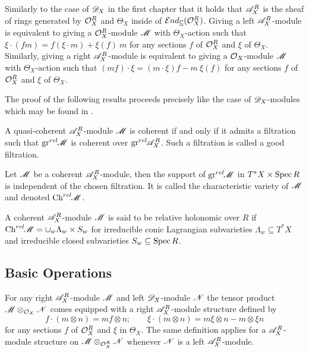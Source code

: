 Similarly to the case of $\mathscr{D}_X$ in the first chapter that  it holds that $\mathscr{A}_X^R$ is the sheaf of rings generated by $\mathcal{O}_X^R$ and $\Theta_X$ inside of $\mathcal{E}nd_{\underline{\mathbb{C}}}(\mathcal{O}_X^R)$. Giving a left $\mathscr{A}_X^R$-module is equivalent to giving a $\mathcal{O}_X^R$-module $\mathscr{M}$ with $\Theta_X$-action such that
$\xi\cdot (fm) = f (\xi \cdot m)  + \xi(f)\ m  $
for any sections $f$ of $\mathcal{O}_X^R$ and $\xi$ of $\Theta_X$. Similarly, giving a right $\mathscr{A}_X^R$-module is equivalent to giving a $\mathcal{O}_X$-module $\mathscr{M}$ with $\Theta_X$-action such that $(mf)\cdot\xi = (m\cdot\xi)f - m\ \xi(f) $ for any sections $f$ of $\mathcal{O}_X^R$ and $\xi$ of $\Theta_X$.

The proof of the following results proceeds precisely like the case of $\mathscr{D}_X$-modules which may be found in \cite[Chapter 2]{hotta2007d}. 
\begin{proposition}\label{prop: CoherentAndGoodFiltration}
    A quasi-coherent $\mathscr{A}_X^R$-module $\mathscr{M}$ is coherent if and only if it admits a filtration such that $\operatorname{gr}^{rel}\mkern-5mu \mathscr{M}$ is coherent over $\operatorname{gr}^{rel}\mkern-5mu \mathscr{A}_X^R$. Such a filtration is called a good filtration.
\end{proposition}
\begin{proposition}
    Let $\mathscr{M}$ be a coherent $\mathscr{A}_X^R$-module, then the support of $\operatorname{gr}^{rel}\mkern-5mu \mathscr{M}$ in $T^*X \times \operatorname{Spec} R$ is independent of the chosen filtration. It is called the characteristic variety of $\mathscr{M}$ and denoted $\operatorname{Ch}^{rel}\mkern-5mu \mathscr{M}$.
\end{proposition}

A coherent $\mathscr{A}_X^R$-module $\mathscr{M}$ is said to be relative holonomic over $R$ if $\operatorname{Ch}^{rel}\mkern-5mu \mathscr{M} = \cup_w \Lambda_w \times S_w$
for irreducible conic Lagrangian subvarieties $\Lambda_w\subseteq T^*X$ and irreducible closed subvarieties $S_w\subseteq \operatorname{Spec} R$.
\subsection{Basic Operations}\label{sec: BasicOperations}
For any right $\mathscr{A}_{X}^R$-module $\mathscr{M}$ and left $\mathscr{D}_X$-module $\mathscr{N}$ the tensor product $\mathscr{M} \otimes_{\mathcal{O}_X} \mathscr{N}$ comes equipped with a right $\mathscr{A}_X^R$-module structure defined by
$$f\cdot (m\otimes n) = mf \otimes n; \qquad \xi \cdot (m\otimes n) = m\xi \otimes n - m\otimes \xi n $$
for any sections $f$ of $\mathcal{O}_X^R$ and $\xi$ in $\Theta_X$. The same definition applies for a $\mathscr{A}_X^R$-module structure on $\mathscr{M}\otimes_{\mathcal{O}_X^R} \mathscr{N}$ whenever $\mathscr{N}$ is a left $\mathscr{A}_X^R$-module.

